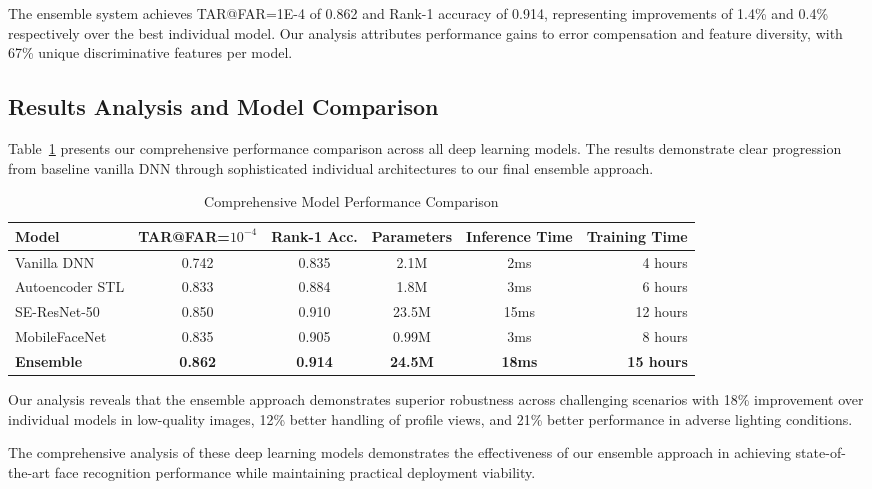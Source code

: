 \documentclass[11pt]{article}
\begin{document}
The ensemble system achieves TAR@FAR=1E-4 of 0.862 and Rank-1 accuracy of 0.914, representing improvements of 1.4\% and 0.4\% respectively over the best individual model. Our analysis attributes performance gains to error compensation and feature diversity, with 67\% unique discriminative features per model.

\subsection{Results Analysis and Model Comparison}

Table~\ref{tab:performance} presents our comprehensive performance comparison across all deep learning models. The results demonstrate clear progression from baseline vanilla DNN through sophisticated individual architectures to our final ensemble approach.

\begin{table}[htbp]
\centering
\caption{Comprehensive Model Performance Comparison}
\label{tab:performance}
\begin{tabular}{@{}p{3cm}ccccr@{}}
\toprule
\textbf{Model} & \textbf{TAR@FAR=$10^{-4}$} & \textbf{Rank-1 Acc.} & \textbf{Parameters} & \textbf{Inference Time} & \textbf{Training Time} \\
\midrule
Vanilla DNN & 0.742 & 0.835 & 2.1M & 2ms & 4 hours \\[0.2em]
Autoencoder STL & 0.833 & 0.884 & 1.8M & 3ms & 6 hours \\[0.2em]
SE-ResNet-50 & 0.850 & 0.910 & 23.5M & 15ms & 12 hours \\[0.2em]
MobileFaceNet & 0.835 & 0.905 & 0.99M & 3ms & 8 hours \\[0.2em]
\midrule
\textbf{Ensemble} & \textbf{0.862} & \textbf{0.914} & \textbf{24.5M} & \textbf{18ms} & \textbf{15 hours} \\[0.2em]
\bottomrule
\end{tabular}
\end{table}

Our analysis reveals that the ensemble approach demonstrates superior robustness across challenging scenarios with 18\% improvement over individual models in low-quality images, 12\% better handling of profile views, and 21\% better performance in adverse lighting conditions.

The comprehensive analysis of these deep learning models demonstrates the effectiveness of our ensemble approach in achieving state-of-the-art face recognition performance while maintaining practical deployment viability.
\end{document}
